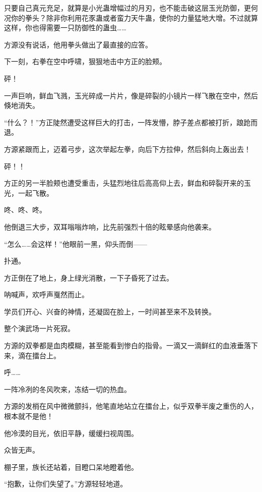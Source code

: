 \begin{this_body}
只要自己真元充足，就算是小光蛊增幅过的月刃，也不能击破这层玉光防御，更何况你的拳头？除非你利用花豕蛊或者蛮力天牛蛊，使你的力量猛地大增。不过就算这样，你也得需要一只防御性的蛊虫……

方源没有说话，他用拳头做出了最直接的应答。

下一刻，右拳在空中呼啸，狠狠地击中方正的脸颊。

砰！

一声巨响，鲜血飞溅，玉光碎成一片片，像是碎裂的小镜片一样飞散在空中，然后倏地消失。

“什么？！”方正陡然遭受这样巨大的打击，一阵发懵，脖子差点都被打折，踉跄而退。

方源紧跟而上，迈着弓步，这次举起左拳，向后下方拉伸，然后斜向上轰出去！

砰！！

方正的另一半脸颊也遭受重击，头猛烈地往后高高仰上去，鲜血和碎裂开来的玉光，一起飞散。

咚、咚、咚。

他倒退三大步，双耳嗡嗡炸响，比先前强烈十倍的眩晕感向他袭来。

“怎么……会这样！”他眼前一黑，仰头而倒——

扑通。

方正倒在了地上，身上绿光消散，一下子昏死了过去。

呐喊声，欢呼声戛然而止。

学员们开心、兴奋的神情，还凝固在脸上，一时间甚至来不及转换。

整个演武场一片死寂。

方源的双拳都是血肉模糊，甚至能看到惨白的指骨。一滴又一滴鲜红的血液垂落下来，滴在擂台上。

呼……

一阵冷冽的冬风吹来，冻结一切的热血。

方源的发梢在风中微微颤抖，他笔直地站立在擂台上，似乎双拳半废之重伤的人，根本就不是他！

他冷漠的目光，依旧平静，缓缓扫视周围。

众皆无声。

棚子里，族长还站着，目瞪口呆地瞪着他。

“抱歉，让你们失望了。”方源轻轻地道。

\end{this_body}

